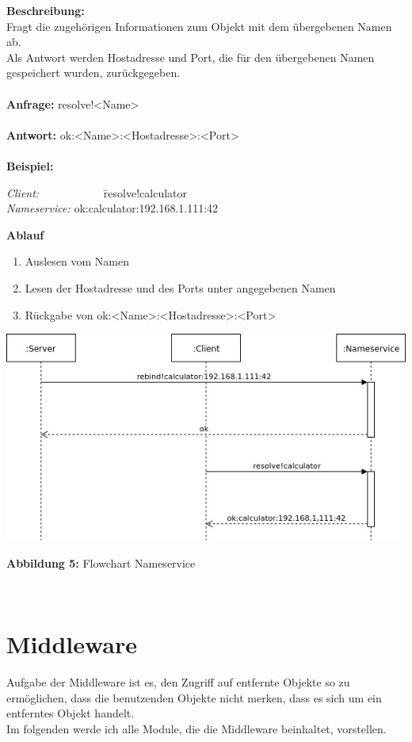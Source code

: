 \textbf{Beschreibung:}\\
Fragt die zugehörigen Informationen zum Objekt mit dem übergebenen Namen ab.\\
Als Antwort werden Hostadresse und Port, die für den übergebenen Namen gespeichert wurden, zurückgegeben.\\ \\
\textbf{Anfrage:} resolve!<Name>\\ \\
\textbf{Antwort:} ok:<Name>:<Hostadresse>:<Port>\\ \\
\textbf{Beispiel:}
\begin{tabbing}
\textit{Client:}~~~~~~~~~~~ \=  resolve!calculator \\
\textit{Nameservice:} \> ok:calculator:192.168.1.111:42
\end{tabbing}
\textbf{Ablauf}
\begin{enumerate}
\item Auslesen vom Namen
\item Lesen der Hostadresse und des Ports unter angegebenen Namen
\item Rückgabe von ok:<Name>:<Hostadresse>:<Port>
\end{enumerate} 

\includegraphics[scale=0.7]{../pictures/FlowChartNameService.jpg}\\
\centerline{\textbf{Abbildung 5:} Flowchart Nameservice}\\

\section{Middleware}
Aufgabe der Middleware ist es, den Zugriff auf entfernte Objekte so zu ermöglichen, dass die benutzenden Objekte nicht merken, dass es sich um ein entferntes Objekt handelt.\\
Im folgenden werde ich alle Module, die die Middleware beinhaltet, vorstellen.

